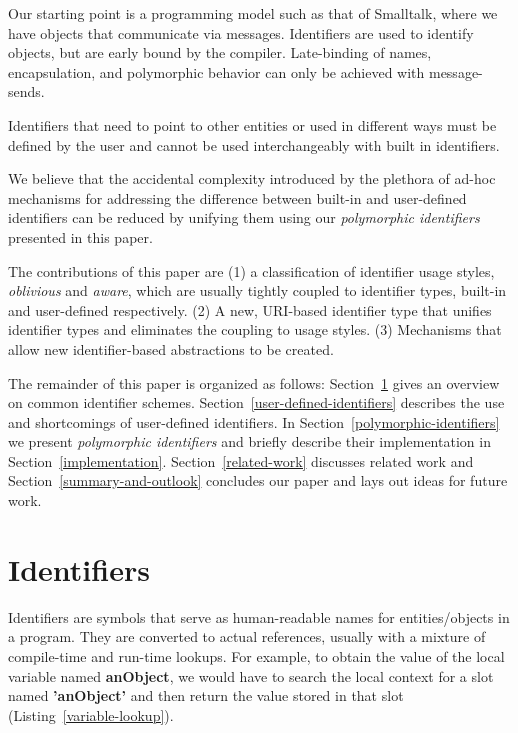 \documentclass[preprint,authoryear]{acm_proc_article-sp}
\begin{document}
Our starting point is a programming model such as that of Smalltalk, where we have objects
that communicate via messages\cite{Goldberg1983}.   Identifiers are used to identify 
objects, but are early bound by the compiler.  Late-binding of names, encapsulation,
and polymorphic behavior can only be achieved with message-sends.




Identifiers that need to point to other entities or used in different ways must be defined
by the user and cannot be used interchangeably with built in identifiers.  

We believe that the accidental complexity introduced by the
plethora of ad-hoc mechanisms for addressing the difference between built-in 
and user-defined identifiers can be reduced 
by unifying them using our \emph{polymorphic identifiers} presented in this paper.

The contributions of this paper are (1) a classification of identifier usage styles, {\em oblivious}
and {\em aware}, which
are usually tightly coupled to identifier types, built-in and user-defined respectively.
(2) A new, URI-based identifier type
that unifies identifier types and eliminates the coupling to usage styles. (3) Mechanisms
that allow new identifier-based abstractions to be created.


The remainder of this paper is organized as follows: 
Section~\ref{identifiers} gives an overview on common identifier schemes.
Section~\ref{user-defined-identifiers} describes the use and shortcomings of user-defined identifiers.
In Section~\ref{polymorphic-identifiers} we present \emph{polymorphic identifiers} and briefly describe their implementation in Section~\ref{implementation}.
Section~\ref{related-work} discusses related work and Section~\ref{summary-and-outlook} concludes our paper and lays out ideas for future work.




\section{Identifiers}
\label{identifiers}

Identifiers are symbols that serve as human-readable names for entities/objects
in a program.  They are converted to actual references, usually with a mixture of
compile-time and run-time lookups.  For example, to obtain the value of the local
variable named {\bf anObject}, we would have to search the local context for
a slot named {\bf 'anObject'} and then return the value stored in that slot (Listing~\ref{variable-lookup}).
\end{document}
